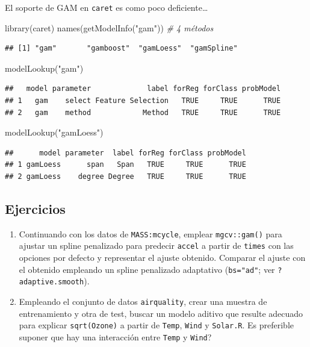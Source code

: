 \documentclass[
]{book}
\newenvironment{Shaded}{\begin{snugshade}}{\end{snugshade}}
\newcommand{\CommentTok}[1]{\textcolor[rgb]{0.56,0.35,0.01}{\textit{#1}}}
\newcommand{\FunctionTok}[1]{\textcolor[rgb]{0.00,0.00,0.00}{#1}}
\newcommand{\NormalTok}[1]{#1}
\newcommand{\StringTok}[1]{\textcolor[rgb]{0.31,0.60,0.02}{#1}}
\theoremstyle{break}
\theoremstyle{definition}
\theoremstyle{definition}
\theoremstyle{definition}
\theoremstyle{definition}
\theoremstyle{remark}
\begin{document}
El soporte de GAM en \texttt{caret} es como poco deficiente\ldots{}

\begin{Shaded}
\begin{Highlighting}[]
\FunctionTok{library}\NormalTok{(caret)}
\FunctionTok{names}\NormalTok{(}\FunctionTok{getModelInfo}\NormalTok{(}\StringTok{"gam"}\NormalTok{)) }\CommentTok{\# 4 métodos}
\end{Highlighting}
\end{Shaded}

\begin{verbatim}
## [1] "gam"       "gamboost"  "gamLoess"  "gamSpline"
\end{verbatim}

\begin{Shaded}
\begin{Highlighting}[]
\FunctionTok{modelLookup}\NormalTok{(}\StringTok{"gam"}\NormalTok{)}
\end{Highlighting}
\end{Shaded}

\begin{verbatim}
##   model parameter             label forReg forClass probModel
## 1   gam    select Feature Selection   TRUE     TRUE      TRUE
## 2   gam    method            Method   TRUE     TRUE      TRUE
\end{verbatim}

\begin{Shaded}
\begin{Highlighting}[]
\FunctionTok{modelLookup}\NormalTok{(}\StringTok{"gamLoess"}\NormalTok{)}
\end{Highlighting}
\end{Shaded}

\begin{verbatim}
##      model parameter  label forReg forClass probModel
## 1 gamLoess      span   Span   TRUE     TRUE      TRUE
## 2 gamLoess    degree Degree   TRUE     TRUE      TRUE
\end{verbatim}

\hypertarget{ejercicios}{%
\subsection{Ejercicios}\label{ejercicios}}

\begin{enumerate}
\def\labelenumi{\arabic{enumi}.}
\item
  Continuando con los datos de \texttt{MASS:mcycle}, emplear \texttt{mgcv::gam()} para ajustar un spline penalizado para predecir \texttt{accel} a partir de \texttt{times} con las opciones por defecto y representar el ajuste obtenido. Comparar el ajuste con el obtenido empleando un spline penalizado adaptativo (\texttt{bs="ad"}; ver \texttt{?adaptive.smooth}).
\item
  Empleando el conjunto de datos \texttt{airquality}, crear una muestra de entrenamiento y otra de test, buscar un modelo aditivo que resulte adecuado para explicar \texttt{sqrt(Ozone)} a partir de \texttt{Temp}, \texttt{Wind} y \texttt{Solar.R}.
  Es preferible suponer que hay una interacción entre \texttt{Temp} y \texttt{Wind}?
\end{enumerate}
\end{document}
